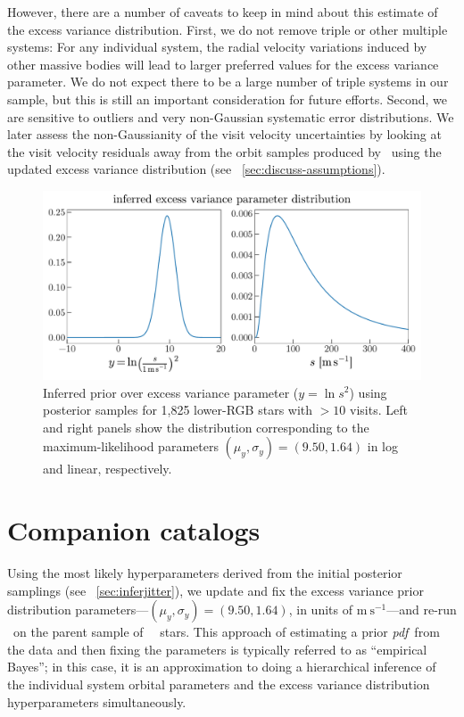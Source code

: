 \documentclass[modern, letterpaper]{aastex62}
\newcommand{\apogee}{\project{\acronym{APOGEE}}}
\newcommand{\thejoker}{\project{The~Joker}}
\newcommand{\DR}{\acronym{DR14}}
\newcommand{\pdf}{\textit{pdf}}
\begin{document}
However, there are a number of caveats to keep in mind about this estimate of
the excess variance distribution.
First, we do not remove triple or other multiple systems: For any individual
system, the radial velocity variations induced by other massive bodies will lead
to larger preferred values for the excess variance parameter.
We do not expect there to be a large number of triple systems in our sample, but
this is still an important consideration for future efforts.
Second, we are sensitive to outliers and very non-Gaussian systematic error
distributions.
We later assess the non-Gaussianity of the visit velocity uncertainties by
looking at the visit velocity residuals away from the orbit samples produced by
\thejoker\ using the updated excess variance distribution (see
\sectionname~\ref{sec:discuss-assumptions}).

\begin{figure}[h]
\begin{center}
\includegraphics[width=\textwidth]{infer-jitter}
\end{center}
\caption{%
Inferred prior over excess variance parameter ($y = \ln s^2$) using posterior
samples for 1,825 lower-RGB stars with $>10$ visits.
Left and right panels show the distribution corresponding to the
maximum-likelihood parameters $(\mu_y, \sigma_y) = (9.50, 1.64)$ in log and
linear, respectively.
\label{fig:infer-jitter}
}
\end{figure}


\section{Companion catalogs}
\label{sec:catalogs}

Using the most likely hyperparameters derived from the initial posterior
samplings (see \sectionname~\ref{sec:inferjitter}), we update and fix the
excess variance prior distribution parameters---$(\mu_{y}, \sigma_{y}) = (9.50,
1.64)$, in units of $\textrm{m}~\textrm{s}^{-1}$---and re-run \thejoker\ on the
parent sample of \apogee\ \DR\ stars.
This approach of estimating a prior \pdf\ from the data and then fixing the
parameters is typically referred to as ``empirical Bayes''; in this case, it is
an approximation to doing a hierarchical inference of the individual system
orbital parameters and the excess variance distribution hyperparameters
simultaneously.
\end{document}
